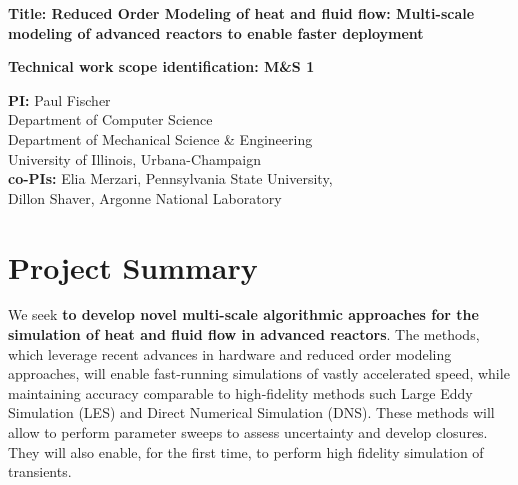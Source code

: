 \parindent 0in
\parskip 0.1in

{\bf Title:  Reduced Order Modeling of heat and fluid flow: Multi-scale
modeling of advanced reactors to enable faster deployment }

{\bf Technical work scope identification: M\&S 1 }

{\bf PI:}
Paul Fischer \\
Department of Computer Science \\
Department of Mechanical Science \& Engineering \\
University of Illinois, Urbana-Champaign \\

{\bf co-PIs:}
Elia Merzari, Pennsylvania State University, \\
Dillon Shaver, Argonne National Laboratory \\

\section{Project Summary}


We seek \textbf{to develop novel multi-scale algorithmic approaches for the
simulation of heat and fluid flow in advanced reactors}. The methods, which
leverage recent advances in hardware and reduced order modeling approaches,
will enable fast-running simulations of vastly accelerated speed, while
maintaining accuracy comparable to high-fidelity methods such Large Eddy
Simulation (LES) and Direct Numerical Simulation (DNS). These methods will
allow to perform
parameter sweeps to assess uncertainty and develop closures. They will also
enable, for the first time, to perform high fidelity simulation of transients.


